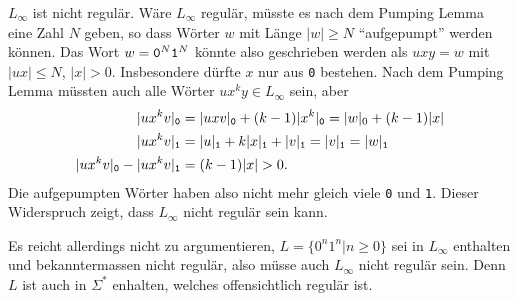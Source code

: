 \begin{loesung}
\begin{teilaufgaben}
\item $L_\infty$ ist nicht regulär. Wäre $L_\infty$ regulär,
müsste es nach dem Pumping Lemma eine Zahl $N$ geben, so dass
Wörter $w$ mit Länge $|w|\ge N$ ``aufgepumpt'' werden können.
Das Wort $w={\tt 0}^N{\tt 1}^N$ könnte also geschrieben werden
als $uxy=w$ mit $|ux|\le N$, $|x|>0$. Insbesondere dürfte $x$ nur
aus {\tt 0} bestehen. Nach dem Pumping Lemma müssten auch alle
Wörter $ux^ky\in L_\infty$ sein, aber
\begin{align*}
|ux^kv|_{\tt 0}
&=
|uxv|_{\tt 0}
+
(k-1) |x^k|_{\tt 0}
=
|w|_0+(k-1)|x|
\\
|ux^kv|_{\tt 1}
&=
|u|_{\tt 1} + k|x|_{\tt 1} + |v|_{\tt 1}
=
|v|_{\tt 1}
=|w|_{\tt 1}
\\
|ux^kv|_{\tt 0}
-
|ux^kv|_{\tt 1}
&=
(k-1)|x|>0.
\end{align*}
Die aufgepumpten Wörter haben also nicht mehr gleich viele
{\tt 0} und {\tt 1}. Dieser Widerspruch zeigt, dass $L_\infty$
nicht regulär sein kann.

Es reicht allerdings nicht zu argumentieren, $L=\{ 0^n1^n|n \ge 0\}$
sei in $L_\infty$ enthalten und bekanntermassen nicht regulär,
also müsse auch $L_\infty$ nicht regulär sein. Denn $L$ ist auch
in $\Sigma^*$ enhalten, welches offensichtlich regulär ist.
\qedhere
\end{teilaufgaben}
\end{loesung}


